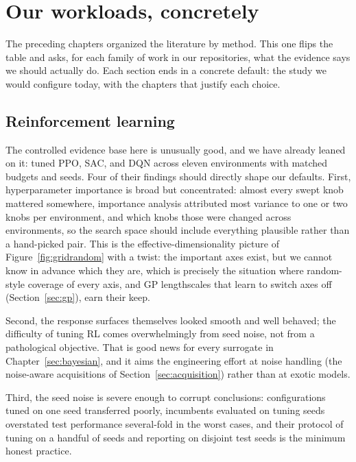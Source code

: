 \chapter{Our workloads, concretely}
\label{sec:workloads}

The preceding chapters organized the literature by method. This one flips
the table and asks, for each family of work in our repositories, what the
evidence says we should actually do. Each section ends in a concrete
default: the study we would configure today, with the chapters that
justify each choice.

\section{Reinforcement learning}

The controlled evidence base here is unusually good, and we have already
leaned on it: \citet{eimer2023hyperparameters} tuned PPO, SAC, and DQN
across eleven environments with matched budgets and seeds. Four of their
findings should directly shape our defaults. First, hyperparameter
importance is broad but concentrated: almost every swept knob mattered
somewhere, importance analysis attributed most variance to one or two knobs
per environment, and which knobs those were changed across environments, so
the search space should include everything plausible rather than a
hand-picked pair. This is the effective-dimensionality picture of
Figure~\ref{fig:gridrandom} with a twist: the important axes exist, but we
cannot know in advance which they are, which is precisely the situation
where random-style coverage of every axis, and GP lengthscales that learn
to switch axes off (Section~\ref{sec:gp}), earn their keep.

Second, the
response surfaces themselves looked smooth and well behaved; the
difficulty of tuning RL comes overwhelmingly from seed noise, not from a
pathological objective. That is good news for every surrogate in
Chapter~\ref{sec:bayesian}, and it aims the engineering effort at noise
handling (the noise-aware acquisitions of
Section~\ref{sec:acquisition}) rather than at exotic models.

Third, the
seed noise is severe enough to corrupt conclusions: configurations tuned
on one seed transferred poorly, incumbents evaluated on tuning seeds
overstated test performance several-fold in the worst cases, and their
protocol of tuning on a handful of seeds and reporting on disjoint test
seeds is the minimum honest practice.

